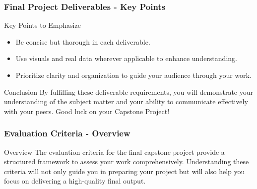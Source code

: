\documentclass[aspectratio=169]{beamer}
\begin{document}
\begin{frame}[fragile]
  \frametitle{Final Project Deliverables - Key Points}
  \begin{block}{Key Points to Emphasize}
    \begin{itemize}
      \item Be concise but thorough in each deliverable.
      \item Use visuals and real data wherever applicable to enhance understanding.
      \item Prioritize clarity and organization to guide your audience through your work.
    \end{itemize}
  \end{block}
  \begin{block}{Conclusion}
    By fulfilling these deliverable requirements, you will demonstrate your understanding of the subject matter and your ability to communicate effectively with your peers. Good luck on your Capstone Project!
  \end{block}
\end{frame}

\begin{frame}[fragile]
  \frametitle{Evaluation Criteria - Overview}
  \begin{block}{Overview}
    The evaluation criteria for the final capstone project provide a structured framework to assess your work comprehensively. Understanding these criteria will not only guide you in preparing your project but will also help you focus on delivering a high-quality final output.
  \end{block}
\end{frame}
\end{document}
